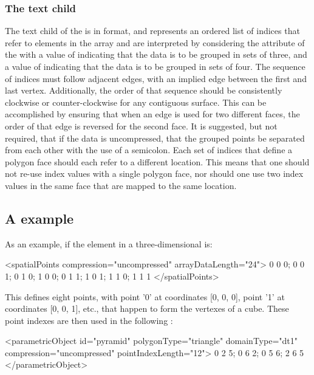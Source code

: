 \subsubsection{The \fixttspace{} text child}
The  text child of the \ParametricObject is in  format, and represents an ordered list of indices that refer to elements in the \SpatialPoints array and are interpreted by considering the  attribute of the \ParametricObject with a value of  indicating that the data is to be grouped in sets of three, and a value of  indicating that the data is to be grouped in sets of four.  The sequence of indices must follow adjacent edges, with an implied edge between the first and last vertex.  Additionally, the order of that sequence should be consistently clockwise or counter-clockwise for any contiguous surface.  This can be accomplished by ensuring that when an edge is used for two different faces, the order of that edge is reversed for the second face.  It is suggested, but not required, that if the data is uncompressed, that the grouped points be separated from each other with the use of a semicolon.  Each set of indices that define a polygon face should each refer to a different location.  This means that one should not re-use index values with a single polygon face, nor should one use two index values in the same face that are mapped to the same location.

\subsection{A  example}
\label{parametricgeometry-example}

As an example, if the \SpatialPoints element in a three-dimensional \Geometry is:

\begin{example}
    <spatialPoints compression="uncompressed" arrayDataLength="24">
        0 0 0; 0 0 1; 0 1 0; 1 0 0; 0 1 1; 1 0 1; 1 1 0; 1 1 1
    </spatialPoints>
\end{example}

This defines eight points, with point '0' at coordinates [0, 0, 0], point '1' at coordinates [0, 0, 1], etc., that happen to form the vertexes of a cube.  These point indexes are then used in the following \ParametricObject:

\begin{example}
    <parametricObject id="pyramid" polygonType="triangle" domainType="dt1"
                      compression="uncompressed" pointIndexLength="12">
        0 2 5; 0 6 2; 0 5 6; 2 6 5
    </parametricObject>
\end{example}

